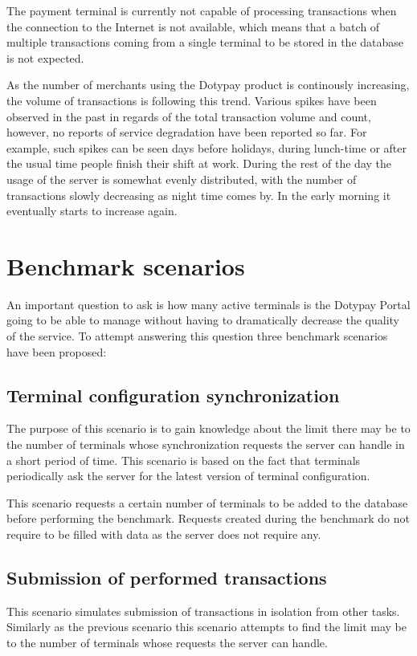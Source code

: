 \documentclass[12pt, a4paper]{article}
\let\oldsection\section
\renewcommand\section{\clearpage\oldsection}
\begin{document}
The payment terminal is currently not capable of processing transactions when the connection to the Internet is not available, which means that a batch of multiple transactions coming from a single terminal to be stored in the database is not expected. 

As the number of merchants using the Dotypay product is continously increasing, the volume of transactions is following this trend.
Various spikes have been observed in the past in regards of the total transaction volume and count, however, no reports of service degradation have been reported so far.
For example, such spikes can be seen days before holidays, during lunch-time or after the usual time people finish their shift at work. During the rest of the day the usage of the server is somewhat evenly distributed, with the number of transactions slowly decreasing as night time comes by. In the early morning it eventually starts to increase again.

\section{Benchmark scenarios}

An important question to ask is how many active terminals is the Dotypay Portal going to be able to manage without having to dramatically decrease the quality of the service. To attempt answering this question three benchmark scenarios have been proposed:


\subsection{Terminal configuration synchronization}
The purpose of this scenario is to gain knowledge about the limit there may be to the number of terminals whose synchronization requests the server can handle in a short period of time. This scenario is based on the fact that terminals periodically ask the server for the latest version of terminal configuration. 

This scenario requests a certain number of terminals to be added to the database before performing the benchmark.
Requests created during the benchmark do not require to be filled with data as the server does not require any. 

\subsection{Submission of performed transactions}
This scenario simulates submission of transactions in isolation from other tasks. Similarly as the previous scenario this scenario attempts to find the limit may be to the number of terminals whose requests the server can handle.
\end{document}
